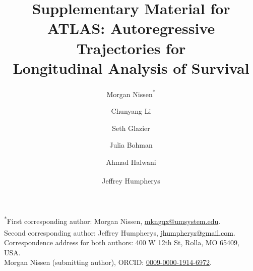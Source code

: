 
\title{\bfseries Supplementary Material for\\ATLAS: Autoregressive Trajectories for\\Longitudinal Analysis of Survival}
\author[1]{Morgan Nissen\textsuperscript{*}}
\author[2,3]{Chunyang Li}
\author[4]{Seth Glazier}
\author[2,3]{Julia Bohman}
\author[2,3]{Ahmad Halwani}
\author[1]{Jeffrey Humpherys\textsuperscript{\textdagger}}
\date{}

\maketitle
\begin{center}\small
\textsuperscript{*}First corresponding author: Morgan Nissen, \href{mailto:mkngqx@umsystem.edu}{mkngqx@umsystem.edu}.\\
\textsuperscript{\textdagger}Second corresponding author: Jeffrey Humpherys, \href{mailto:jhumpherys@gmail.com}{jhumpherys@gmail.com}.\\
Correspondence address for both authors: 400 W 12th St, Rolla, MO 65409, USA.\\
Morgan Nissen (submitting author), ORCID: \href{https://orcid.org/0009-0000-1914-6972}{0009-0000-1914-6972}.
\end{center}

\clearpage


